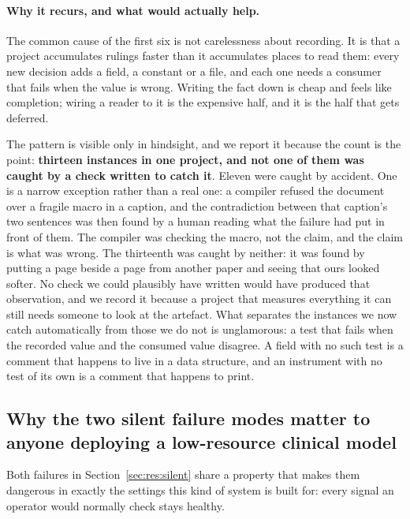 \paragraph{Why it recurs, and what would actually help.} The common cause of the
first six is not carelessness about recording. It is that a project accumulates rulings faster
than it accumulates places to read them: every new decision adds a field, a
constant or a file, and each one needs a consumer that fails when the value is
wrong. Writing the fact down is cheap and feels like completion; wiring a reader
to it is the expensive half, and it is the half that gets deferred.

The pattern is visible only in hindsight, and we report it because the count is
the point: \textbf{thirteen instances in one project, and not one of them was
caught by a check written to catch it}. Eleven were caught by accident. One is a
narrow exception rather than a real one: a compiler refused the document over a
fragile macro in a caption, and the contradiction between that caption's two
sentences was then found by a human reading what the failure had put in front of
them. The compiler was checking the macro, not the claim, and the claim is what
was wrong. The thirteenth was caught by neither: it was found by putting a page
beside a page from another paper and seeing that ours looked softer. No check we
could plausibly have written would have produced that observation, and we record
it because a project that measures everything it can still needs someone to look
at the artefact. What separates the instances we now
catch automatically from those we do not is unglamorous: a test that fails when
the recorded value and the consumed value disagree. A field with no such test is
a comment that happens to live in a data structure, and an instrument with no
test of its own is a comment that happens to print.

\subsection{Why the two silent failure modes matter to anyone deploying a
low-resource clinical model}

Both failures in Section~\ref{sec:res:silent} share a property that makes them
dangerous in exactly the settings this kind of system is built for: every signal
an operator would normally check stays healthy.

